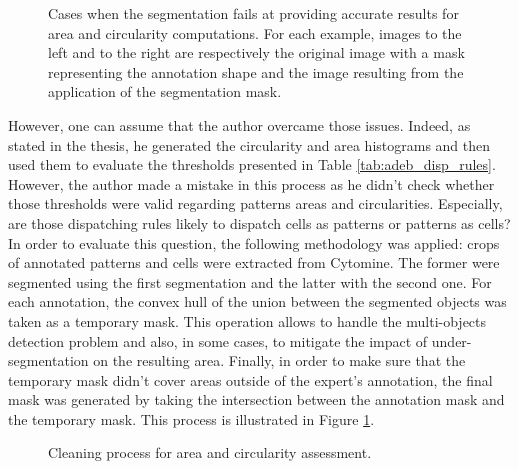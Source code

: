 \begin{figure}
	\center 
	\hfill
	\hfill
	\caption{Cases when the segmentation fails at providing accurate results for area and circularity computations. For each example, images to the left and to the right are respectively the original image with a mask representing the annotation shape and the image resulting from the application of the segmentation mask.}
\end{figure}

However, one can assume that the author overcame those issues. Indeed, as stated in the thesis, he generated the circularity and area histograms and then used them to evaluate the thresholds presented in Table \ref{tab:adeb_disp_rules}. However, the author made a mistake in this process as he didn't check whether those thresholds were valid regarding patterns areas and circularities. Especially, are those dispatching rules likely to dispatch cells as patterns or patterns as cells? In order to evaluate this question, the following methodology was applied: crops of annotated patterns and cells were extracted from Cytomine. The former were segmented using the first segmentation and the latter with the second one. For each annotation, the convex hull of the union between the segmented objects was taken as a temporary mask. This operation allows to handle the multi-objects detection problem and also, in some cases, to mitigate the impact of under-segmentation on the resulting area. Finally, in order to make sure that the temporary mask didn't cover areas outside of the expert's annotation, the final mask was generated by taking the intersection between the annotation mask and the temporary mask. This process is illustrated in Figure \ref{fig:annot_cleaning}.

\begin{figure}
	\center
	\caption{Cleaning process for area and circularity assessment.}
	\label{fig:annot_cleaning}
\end{figure}

